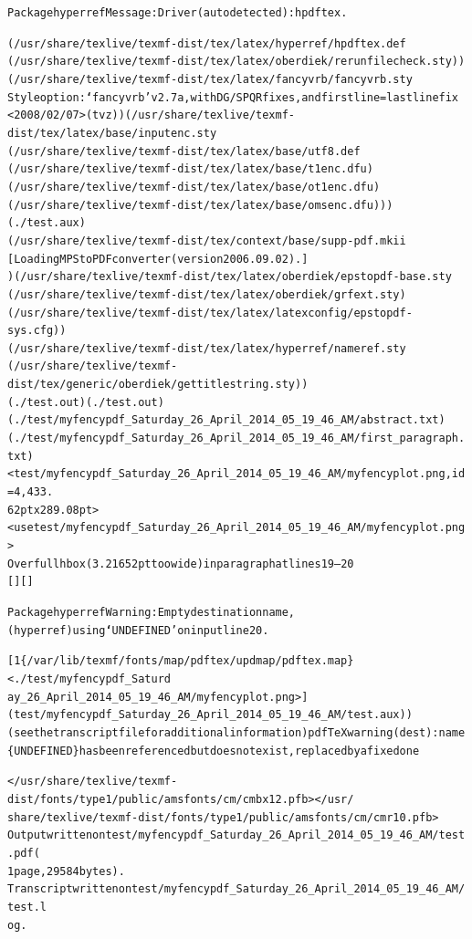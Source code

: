 \documentclass[letterpaper,10pt,english]{sphinxmanual}
\begin{document}
\begin{alltt}
Package hyperref Message: Driver (autodetected): hpdftex.

(/usr/share/texlive/texmf-dist/tex/latex/hyperref/hpdftex.def
(/usr/share/texlive/texmf-dist/tex/latex/oberdiek/rerunfilecheck.sty))
(/usr/share/texlive/texmf-dist/tex/latex/fancyvrb/fancyvrb.sty
Style option: {\color{red}\bfseries{}{}`}fancyvrb' v2.7a, with DG/SPQR fixes, and firstline=lastline fix
\textless{}2008/02/07\textgreater{} (tvz)) (/usr/share/texlive/texmf-dist/tex/latex/base/inputenc.sty
(/usr/share/texlive/texmf-dist/tex/latex/base/utf8.def
(/usr/share/texlive/texmf-dist/tex/latex/base/t1enc.dfu)
(/usr/share/texlive/texmf-dist/tex/latex/base/ot1enc.dfu)
(/usr/share/texlive/texmf-dist/tex/latex/base/omsenc.dfu))) (./test.aux)
(/usr/share/texlive/texmf-dist/tex/context/base/supp-pdf.mkii
{[}Loading MPS to PDF converter (version 2006.09.02).{]}
) (/usr/share/texlive/texmf-dist/tex/latex/oberdiek/epstopdf-base.sty
(/usr/share/texlive/texmf-dist/tex/latex/oberdiek/grfext.sty)
(/usr/share/texlive/texmf-dist/tex/latex/latexconfig/epstopdf-sys.cfg))
(/usr/share/texlive/texmf-dist/tex/latex/hyperref/nameref.sty
(/usr/share/texlive/texmf-dist/tex/generic/oberdiek/gettitlestring.sty))
(./test.out) (./test.out)
(./test/myfencypdf\_Saturday\_26\_April\_2014\_05\_19\_46\_AM/abstract.txt)
(./test/myfencypdf\_Saturday\_26\_April\_2014\_05\_19\_46\_AM/first\_paragraph.txt)
\textless{}test/myfencypdf\_Saturday\_26\_April\_2014\_05\_19\_46\_AM/myfencyplot.png, id=4, 433.
62pt x 289.08pt\textgreater{}
\textless{}use test/myfencypdf\_Saturday\_26\_April\_2014\_05\_19\_46\_AM/myfencyplot.png\textgreater{}
Overfull hbox (3.21652pt too wide) in paragraph at lines 19--20
{[}{]}{[}{]}

Package hyperref Warning: Empty destination name,
(hyperref)                using {\color{red}\bfseries{}{}`}UNDEFINED' on input line 20.

{[}1\{/var/lib/texmf/fonts/map/pdftex/updmap/pdftex.map\} \textless{}./test/myfencypdf\_Saturd
ay\_26\_April\_2014\_05\_19\_46\_AM/myfencyplot.png\textgreater{}{]}
(test/myfencypdf\_Saturday\_26\_April\_2014\_05\_19\_46\_AM/test.aux) )
(see the transcript file for additional information)pdfTeX warning (dest): name
\{UNDEFINED\} has been referenced but does not exist, replaced by a fixed one

\textless{}/usr/share/texlive/texmf-dist/fonts/type1/public/amsfonts/cm/cmbx12.pfb\textgreater{}\textless{}/usr/
share/texlive/texmf-dist/fonts/type1/public/amsfonts/cm/cmr10.pfb\textgreater{}
Output written on test/myfencypdf\_Saturday\_26\_April\_2014\_05\_19\_46\_AM/test.pdf (
1 page, 29584 bytes).
Transcript written on test/myfencypdf\_Saturday\_26\_April\_2014\_05\_19\_46\_AM/test.l
og.
\end{alltt}
\label{index:module-ecoop}
\end{document}
